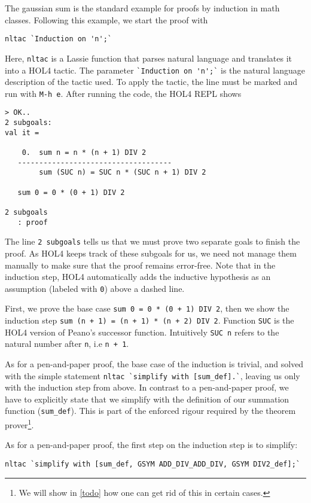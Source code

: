 \documentclass[10pt]{scrartcl}
\newcommand{\ekey}[1]{\texttt{#1}}
\begin{document}
The gaussian sum is the standard example for proofs by induction in math classes.
Following this example, we start the proof with
\begin{lstlisting}
nltac `Induction on 'n';`
\end{lstlisting}

Here, \lstinline{nltac} is a Lassie function that parses natural language and
translates it into a HOL4 tactic.
The parameter \lstinline{`Induction on 'n';`} is the natural language
description of the tactic used.
To apply the tactic, the line must be marked and run with \ekey{M-h e}.
After running the code, the HOL4 REPL shows
\begin{lstlisting}
> OK..
2 subgoals:
val it =

    0.  sum n = n * (n + 1) DIV 2
   ------------------------------------
        sum (SUC n) = SUC n * (SUC n + 1) DIV 2

   sum 0 = 0 * (0 + 1) DIV 2

2 subgoals
   : proof
\end{lstlisting}

The line \lstinline{2 subgoals} tells us that we must prove two separate goals
to finish the proof.
As HOL4 keeps track of these subgoals for us, we need not manage them manually
to make sure that the proof remains error-free.
Note that in the induction step, HOL4 automatically adds the inductive
hypothesis as an assumption (labeled with \lstinline{0}) above a dashed line.

First, we prove the base case \lstinline{sum 0 = 0 * (0 + 1) DIV 2}, then we
show the induction step \lstinline{sum (n + 1) = (n + 1) * (n + 2) DIV 2}.
Function \lstinline{SUC} is the HOL4 version of Peano's successor function.
Intuitively \lstinline{SUC n} refers to the natural number after \lstinline{n},
i.e \lstinline{n + 1}.

As for a pen-and-paper proof, the base case of the induction is trivial, and
solved with the simple statement \lstinline{nltac `simplify with [sum_def].`},
leaving us only with the induction step from above.
In contrast to a pen-and-paper proof, we have to explicitly state that we
simplify with the definition of our summation function (\lstinline{sum_def}).
This is part of the enforced rigour required by the theorem prover\footnote{
We will show in \autoref{todo} how one can get rid of this in certain cases.}.

As for a pen-and-paper proof, the first step on the induction step is to
simplify:
\begin{lstlisting}
nltac `simplify with [sum_def, GSYM ADD_DIV_ADD_DIV, GSYM DIV2_def];`
\end{lstlisting}
\end{document}
